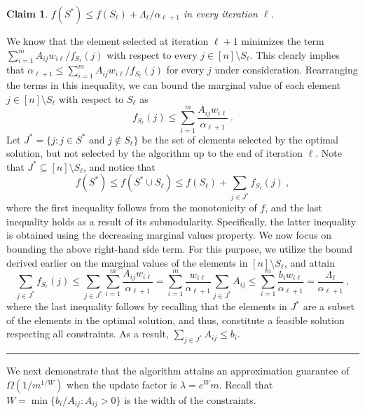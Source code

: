 \documentclass[11pt]{article}
\theoremstyle{plain}
\newtheorem{claim}[theorem]{Claim}
\theoremstyle{definition}
\newcommand{\qedsymb}{\hfill{\rule{2mm}{2mm}}}
\renewenvironment{proof}{\begin{trivlist} \item[\hspace{\labelsep}{\bf \noindent Proof.\/}] }{\qedsymb\end{trivlist}}\newenvironment{proofof}[1]{\begin{trivlist} \item[\hspace{\labelsep}{\bf \noindent Proof of #1.\/}] }{\qedsymb\end{trivlist}}\newenvironment{MyEqn}[1]{\setlength\arraycolsep{2pt}\begin{eqnarray*} #1}{\end{eqnarray*}}
\begin{document}
\begin{claim} \label{claim:OPTBound}
$f(S^*) \leq f(S_\ell) + \Lambda_\ell / \alpha_{\ell+1}$ in every
iteration $\ell$.
\end{claim}
\begin{proof}
We know that the element selected at iteration $\ell + 1$
minimizes the term $\sum_{i=1}^{m} A_{ij}w_{i\ell} /
f_{S_\ell}(j)$ with respect to every $j \in [n] \setminus S_\ell$.
This clearly implies that $\alpha_{\ell + 1} \leq \sum_{i=1}^{m}
A_{ij}w_{i\ell} / f_{S_\ell}(j)$ for every $j$ under
consideration. Rearranging the terms in this inequality, we can
bound the marginal value of each element $j \in [n] \setminus
S_\ell$ with respect to $S_\ell$ as
$$
f_{S_\ell}(j) \leq \sum_{i=1}^{m}
\frac{A_{ij}w_{i\ell}}{\alpha_{\ell+1}} \ .
$$
Let $J^* = \{j: j \in S^* \text{ and } j \notin S_\ell \}$ be the
set of elements selected by the optimal solution, but not selected
by the algorithm up to the end of iteration $\ell$. Note that $J^*
\subseteq [n] \setminus S_\ell$, and notice that
$$
f(S^*) \leq f(S^* \cup S_\ell) \leq f(S_\ell) + \sum_{j \in J^*}
f_{S_\ell}(j) \ ,
$$
where the first inequality follows from the monotonicity of $f$,
and the last inequality holds as a result of its submodularity.
Specifically, the latter inequality is obtained using the
decreasing marginal values property. We now focus on bounding the
above right-hand side term. For this purpose, we utilize the bound
derived earlier on the marginal values of the elements in $[n]
\setminus S_\ell$, and attain
$$
\sum_{j \in J^*} f_{S_\ell}(j) \leq \sum_{j \in J^*}
\sum_{i=1}^{m} \frac{A_{ij}w_{i\ell}}{\alpha_{\ell+1}} =
\sum_{i=1}^{m} \frac{w_{i\ell}}{\alpha_{\ell+1}} \sum_{j \in J^*}
A_{ij} \leq \sum_{i=1}^{m} \frac{b_i w_{i\ell}}{\alpha_{\ell+1}} =
\frac{\Lambda_\ell}{\alpha_{\ell+1}} \ ,
$$
where the last inequality follows by recalling that the elements
in $J^*$ are a subset of the elements in the optimal solution, and
thus, constitute a feasible solution respecting all constraints.
As a result, $\sum_{j \in J^*} A_{ij} \leq b_i$.~
\end{proof}

We next demonstrate that the algorithm attains an approximation
guarantee of $\Omega(1 / m^{1/W})$ when the update factor is
$\lambda = e^W m$. Recall that $W = \min\{b_i / A_{ij} : A_{ij} >
0\}$ is the width of the constraints.
\end{document}
